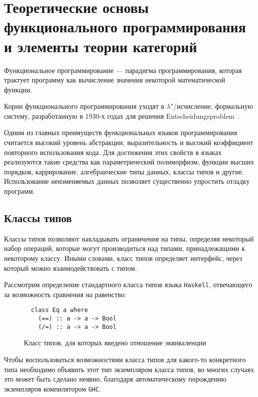 
\chapter{Теоретические основы функционального программирования и элементы теории 
         категорий}

Функциональное программирование --- парадигма программирования, которая трактует 
программу как вычисление значения некоторой математической функции.

Корни функционального программирования уходят в $\lambda$"/исчисление,
формальную систему, разработанную в 1930-х годах для решения
Entscheidungsproblem~\cite{entscheidungsproblem}.

Одним из главных преимуществ функциональных языков программирования считается
высокий уровень абстракции, выразительность и высокий коэффициент повторного
использования кода. Для достижения этих свойств в языках реализуются такие
средства как параметрический полиморфизм, функции высших порядков, каррирование,
алгебраические типы данных, классы типов и другие. Использование неизменяемых
данных позволяет существенно упростить отладку программ.

\section{Классы типов}

  Классы типов позволяют накладывать ограничения на типы, определяя некоторый
  набор операций, которые могут производиться над типами, принадлежащими к
  некоторому классу. Иными словами, класс типов определяет интерфейс,
  через который можно взаимодействовать с типом.

  Рассмотрим определение стандартного класса типов языка \lstinline{Haskell},
  отвечающего за возможность сравнения на равенство:

  \begin{figure}[h]
  \begin{lstlisting}
  class Eq a where
    (==) :: a -> a -> Bool
    (/=) :: a -> a -> Bool
  \end{lstlisting}
  \caption{Класс типов, для которых введено отношение эквиваленции}
  \label{listing:Eq}
  \end{figure}

  Чтобы воспользоваться возможностями класса типов для какого-то конкретного типа
  необходимо объявить этот тип экземпляром класса типов, во многих случаях это
  может быть сделано неявно, благодаря автоматическому порождению экземпляров
  компилятором \lstinline{GHC}.

